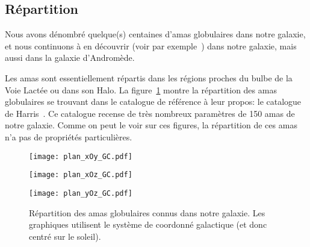 		\subsection{Répartition}

			Nous avons dénombré quelque(s) centaines d'amas globulaires dans
			notre galaxie, et nous continuons à en découvrir (voir par
			exemple~\cite{2014ApJ...786L...3L}) dans notre galaxie, mais aussi dans la galaxie d'Andromède.

			Les amas sont essentiellement répartis dans les régions proches du
			bulbe de la Voie Lactée ou dans son Halo.
			La figure~\ref{Fig::Intro::repartition} montre la répartition des amas
			globulaires se trouvant dans le catalogue de référence à leur propos: le
			catalogue de Harris~\cite{Harris}. Ce catalogue recense de très nombreux paramètres
			de 150 amas de notre galaxie.
			Comme on peut le voir sur ces figures, la répartition de ces amas n'a pas de propriétés particulières.

			\begin{figure}[h]
				\begin{minipage}{0.32\textwidth}
					\begin{center}
						\texttt{[image: plan\_xOy\_GC.pdf]}
					\end{center}
				\end{minipage}\hfill
				\begin{minipage}{0.32\textwidth}
					\begin{center}
						\texttt{[image: plan\_xOz\_GC.pdf]}
					\end{center}
				\end{minipage}\hfill
				\begin{minipage}{0.32\textwidth}
					\begin{center}
						\texttt{[image: plan\_yOz\_GC.pdf]}
					\end{center}
				\end{minipage}
				\caption{\label{Fig::Intro::repartition}Répartition des amas globulaires connus dans notre galaxie. Les graphiques utilisent le système de coordonné galactique (et donc centré sur le soleil).}
			\end{figure}


